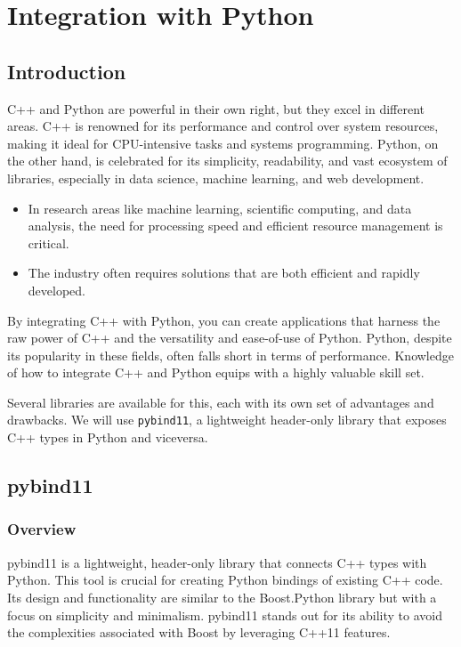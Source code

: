 \chapter{Integration with Python}

\section{Introduction}

C++ and Python are powerful in their own right, but they excel in different areas. C++ is renowned
for its performance and control over system resources, making it ideal for CPU-intensive tasks and
systems programming. Python, on the other hand, is celebrated for its simplicity, readability, and
vast ecosystem of libraries, especially in data science, machine learning, and web development.
\begin{itemize}
    \item In research areas like machine learning, scientific computing, and data analysis, the need for
    processing speed and efficient resource management is critical.
    \item The industry often requires solutions that are both efficient and rapidly developed.
\end{itemize}
By integrating C++ with Python, you can create applications that harness the raw power of C++
and the versatility and ease-of-use of Python. Python, despite its popularity in these fields, often
falls short in terms of performance. Knowledge of how to integrate C++ and Python equips with a
highly valuable skill set.

Several libraries are available for this, each with its own set of advantages and drawbacks.
We will use \texttt{pybind11}, a lightweight header-only library that exposes C++ types in Python and viceversa.

\section{pybind11}

\subsection{Overview}

pybind11 is a lightweight, header-only library that connects C++ types with Python. This tool is
crucial for creating Python bindings of existing C++ code. Its design and functionality are similar to
the Boost.Python library but with a focus on simplicity and minimalism. pybind11 stands out for its
ability to avoid the complexities associated with Boost by leveraging C++11 features.

